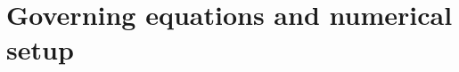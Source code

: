 \documentclass{article}
\begin{document}


\newpage
\section{Governing equations and numerical setup}
\end{document}
